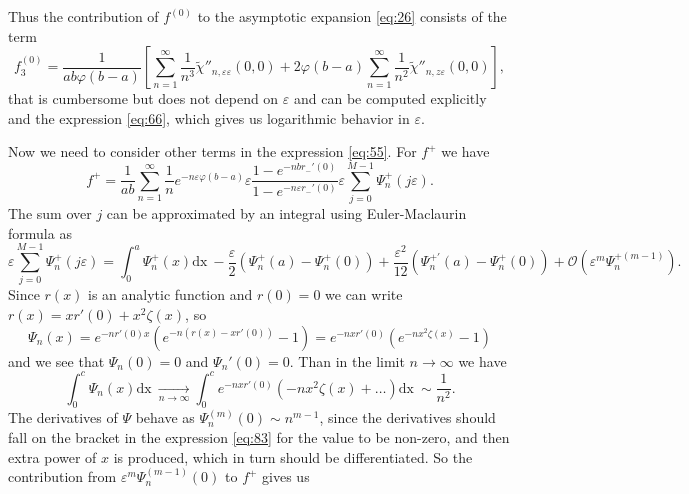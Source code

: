 \documentclass{article}
\newcommand{\dx}{\mathrm{dx}~}
\begin{document}
Thus the contribution of $f^{(0)}$ to the asymptotic expansion \eqref{eq:26} consists of the term 
\begin{equation}
  \label{eq:87}
f^{(0)}_{3}=\frac{1}{ab\varphi(b-a)}\left[\sum_{n=1}^{\infty} \frac{1}{n^{3}}
  \tilde{\chi}''_{n,\varepsilon\varepsilon}(0,0)+2\varphi(b-a)\sum_{n=1}^{\infty}\frac{1}{n^{2}}\tilde{\chi}''_{n,z\varepsilon}(0,0)\right],
\end{equation}
that is cumbersome but does not depend on $\varepsilon$ and can be computed explicitly and the
expression \eqref{eq:66}, which gives us logarithmic behavior in $\varepsilon$.

Now we need to consider other terms in the expression \eqref{eq:55}. For $f^{+}$ we have
\begin{equation}
  \label{eq:67}
  f^{+}=\frac{1}{ab}\sum_{n=1}^{\infty}\frac{1}{n} e^{-n\varepsilon\varphi(b-a)} \varepsilon
  \frac{1-e^{-nbr_{-}'(0)}}{1-e^{-n\varepsilon r_{-}'(0)}}\varepsilon\sum_{j=0}^{M-1}\Psi^{+}_{n}(j\varepsilon).
\end{equation}
The sum over $j$ can be approximated by an integral using Euler-Maclaurin formula as
\begin{equation}
  \label{eq:68}
  \varepsilon\sum_{j=0}^{M-1}\Psi^{+}_{n}(j\varepsilon) = \int_{0}^{a}\Psi^{+}_{n}(x) \dx -
  \frac{\varepsilon}{2}\left(\Psi^{+}_{n}(a)-\Psi^{+}_{n}(0)\right)+
  \frac{\varepsilon^{2}}{12}\left(\Psi^{+'}_{n}(a)-\Psi^{+}_{n}(0)\right)+
  \mathcal{O}\left(\varepsilon^{m}\Psi^{+(m-1)}_{n}\right).
\end{equation}
Since $r(x)$ is an analytic function and $r(0)=0$ we can write $r(x)=xr'(0)+x^{2}\zeta(x)$, so 
\begin{equation}
  \label{eq:83}
\Psi_{n}(x)=e^{-nr'(0)x}\left(e^{-n\left(r(x)-xr'(0)\right)}-1\right)=e^{-nxr'(0)}\left(e^{-nx^{2}\zeta(x)}-1\right)  
\end{equation}
and we see that $\Psi_{n}(0)=0$ and $\Psi_{n}'(0)=0$.
Than in the limit $n\to\infty$ we have
\begin{equation}
  \label{eq:69}
  \int_{0}^{c}\Psi_{n}(x)
  \dx \xrightarrow[n\to\infty]{}\int_{0}^{c}e^{-nxr'(0)}\left(-nx^{2}\zeta(x)+\dots\right)\dx\sim \frac{1}{n^{2}}.
\end{equation}
The derivatives of $\Psi$ behave as $\Psi_{n}^{(m)}(0)\sim n^{m-1}$, since the derivatives should
fall on the bracket in the expression \eqref{eq:83} for the value to be non-zero, and then extra
power of $x$ is produced, which in turn should be differentiated. So the contribution from
$\varepsilon^{m}\Psi_{n}^{(m-1)}(0)$ to $f^{+}$ gives us
\end{document}
